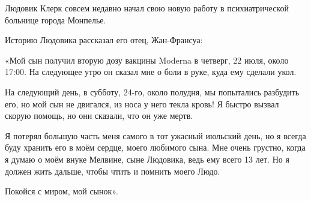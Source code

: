 Людовик Клерк совсем недавно начал свою новую работу в психиатрической больнице
города Монпелье.

Историю Людовика рассказал его отец, Жан-Франсуа:

«Мой сын получил вторую дозу вакцины Moderna в четверг, 22 июля, около 17:00. На
следующее утро он сказал мне о боли в руке, куда ему сделали укол.

На следующий день, в субботу, 24-го, около полудня, мы попытались разбудить его,
но мой сын не двигался, из носа у него текла кровь! Я быстро вызвал скорую
помощь, но они сказали, что он уже мертв.

Я потерял большую часть меня самого в тот ужасный июльский день, но я всегда
буду хранить его в моём сердце, моего любимого сына. Мне очень грустно, когда я
думаю о моём внуке Мелвине, сыне Людовика, ведь ему всего 13 лет. Но я должен
жить дальше, чтобы чтить и помнить моего Людо.

Покойся с миром, мой сынок».

